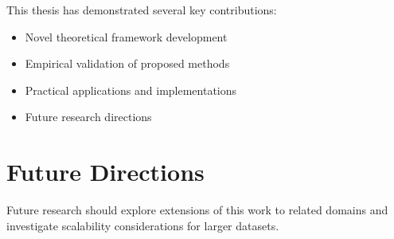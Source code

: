 \documentclass[12pt]{e_class_thesis}
\begin{document}
This thesis has demonstrated several key contributions:
\begin{itemize}
    \item Novel theoretical framework development
    \item Empirical validation of proposed methods
    \item Practical applications and implementations
    \item Future research directions
\end{itemize}

\section{Future Directions}

Future research should explore extensions of this work to related domains and investigate scalability considerations for larger datasets.
\end{document}
